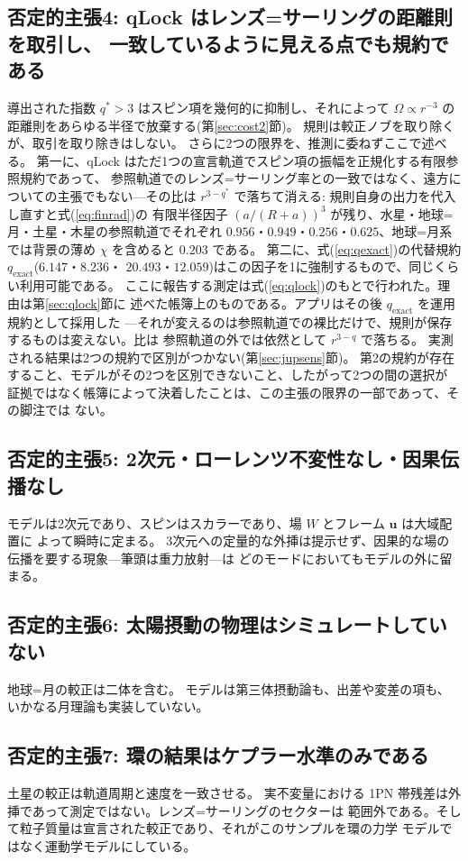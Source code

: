\documentclass[a4paper,10pt,twocolumn]{ltjsarticle}
\begin{document}
\subsection{否定的主張4: qLock はレンズ=サーリングの距離則を取引し、
  一致しているように見える点でも規約である}
導出された指数 $q^{*}>3$ はスピン項を幾何的に抑制し、それによって
$\Omega\propto r^{-3}$ の距離則をあらゆる半径で放棄する(第\ref{sec:cost2}節)。
規則は較正ノブを取り除くが、取引を取り除きはしない。
さらに2つの限界を、推測に委ねずここで述べる。
第一に、qLock はただ1つの宣言軌道でスピン項の振幅を正規化する有限参照規約であって、
参照軌道でのレンズ=サーリング率との一致ではなく、遠方についての主張でもない---その比は
$r^{3-q^{*}}$ で落ちて消える: 規則自身の出力を代入し直すと式(\ref{eq:finrad})の
有限半径因子 $(a/(R+a))^{3}$ が残り、水星・地球=月・土星・木星の参照軌道でそれぞれ
$0.956$・$0.949$・$0.256$・$0.625$、地球=月系では背景の薄め $\chi$ を含めると
$0.203$ である。
第二に、式(\ref{eq:qexact})の代替規約 $q_{\mathrm{exact}}$($6.147$・$8.236$・
$20.493$・$12.059$)はこの因子を1に強制するもので、同じくらい利用可能である。
ここに報告する測定は式(\ref{eq:qlock})のもとで行われた。理由は第\ref{sec:qlock}節に
述べた帳簿上のものである。アプリはその後 $q_{\mathrm{exact}}$ を運用規約として採用した
---それが変えるのは参照軌道での裸比だけで、規則が保存するものは変えない。比は
参照軌道の外では依然として $r^{3-q}$ で落ちる。
実測される結果は2つの規約で区別がつかない(第\ref{sec:jupsens}節)。
第2の規約が存在すること、モデルがその2つを区別できないこと、したがって2つの間の選択が
証拠ではなく帳簿によって決着したことは、この主張の限界の一部であって、その脚注では
ない。

\subsection{否定的主張5: 2次元・ローレンツ不変性なし・因果伝播なし}
モデルは2次元であり、スピンはスカラーであり、場 $W$ とフレーム $\bm u$ は大域配置に
よって瞬時に定まる。
3次元への定量的な外挿は提示せず、因果的な場の伝播を要する現象---筆頭は重力放射---は
どのモードにおいてもモデルの外に留まる。

\subsection{否定的主張6: 太陽摂動の物理はシミュレートしていない}
地球=月の較正は二体を含む。
モデルは第三体摂動論も、出差や変差の項も、いかなる月理論も実装していない。

\subsection{否定的主張7: 環の結果はケプラー水準のみである}
土星の較正は軌道周期と速度を一致させる。
実不変量における 1PN 帯残差は外挿であって測定ではない。レンズ=サーリングのセクターは
範囲外である。そして粒子質量は宣言された較正であり、それがこのサンプルを環の力学
モデルではなく運動学モデルにしている。
\end{document}
